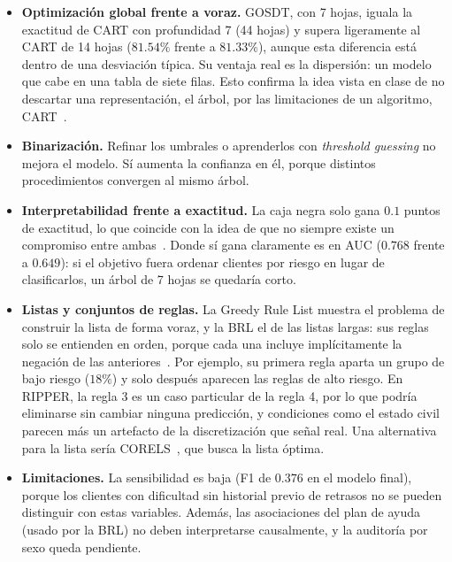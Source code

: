 \documentclass[a4paper,11pt]{article}
\begin{document}
\begin{itemize}
    \item \textbf{Optimización global frente a voraz.} GOSDT, con 7 hojas, iguala la exactitud de CART con profundidad 7 (44 hojas) y supera ligeramente al CART de 14 hojas ($81.54\%$ frente a $81.33\%$), aunque esta diferencia está dentro de una desviación típica. Su ventaja real es la dispersión: un modelo que cabe en una tabla de siete filas. Esto confirma la idea vista en clase de no descartar una representación, el árbol, por las limitaciones de un algoritmo, CART~\cite{slidesInterpretable}.
    \item \textbf{Binarización.} Refinar los umbrales o aprenderlos con \textit{threshold guessing} no mejora el modelo. Sí aumenta la confianza en él, porque distintos procedimientos convergen al mismo árbol.
    \item \textbf{Interpretabilidad frente a exactitud.} La caja negra solo gana $0.1$ puntos de exactitud, lo que coincide con la idea de que no siempre existe un compromiso entre ambas~\cite{rudin2019,slidesInterpretable}. Donde sí gana claramente es en AUC ($0.768$ frente a $0.649$): si el objetivo fuera ordenar clientes por riesgo en lugar de clasificarlos, un árbol de 7 hojas se quedaría corto.
    \item \textbf{Listas y conjuntos de reglas.} La Greedy Rule List muestra el problema de construir la lista de forma voraz, y la BRL el de las listas largas: sus reglas solo se entienden en orden, porque cada una incluye implícitamente la negación de las anteriores~\cite{slidesLogical}. Por ejemplo, su primera regla aparta un grupo de bajo riesgo ($18\%$) y solo después aparecen las reglas de alto riesgo. En RIPPER, la regla 3 es un caso particular de la regla 4, por lo que podría eliminarse sin cambiar ninguna predicción, y condiciones como el estado civil parecen más un artefacto de la discretización que señal real. Una alternativa para la lista sería CORELS~\cite{angelino2018}, que busca la lista óptima.
    \item \textbf{Limitaciones.} La sensibilidad es baja (F1 de $0.376$ en el modelo final), porque los clientes con dificultad sin historial previo de retrasos no se pueden distinguir con estas variables. Además, las asociaciones del plan de ayuda (usado por la BRL) no deben interpretarse causalmente, y la auditoría por sexo queda pendiente.
\end{itemize}

\end{document}
